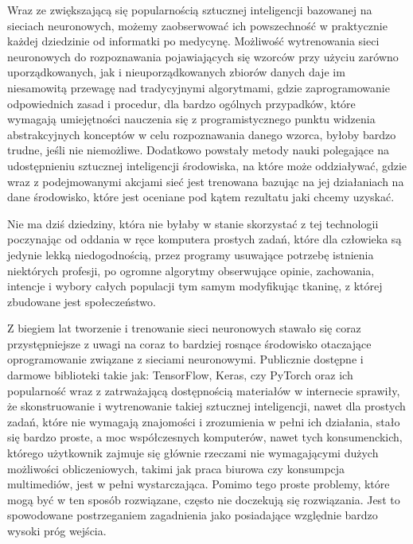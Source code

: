 Wraz ze zwiększającą się popularnością sztucznej inteligencji bazowanej na sieciach neuronowych, możemy zaobserwować ich powszechność w praktycznie każdej dziedzinie od informatki po medycynę. Możliwość wytrenowania sieci neuronowych do rozpoznawania pojawiających się wzorców przy użyciu zarówno uporządkowanych, jak i nieuporządkowanych zbiorów danych daje im niesamowitą przewagę nad tradycyjnymi algorytmami, gdzie zaprogramowanie odpowiednich zasad i procedur, dla bardzo ogólnych przypadków, które wymagają umiejętności nauczenia się z programistycznego punktu widzenia abstrakcyjnych konceptów w celu rozpoznawania danego wzorca, byłoby bardzo trudne, jeśli nie niemożliwe. Dodatkowo powstały metody nauki polegające na udostępnieniu  sztucznej inteligencji środowiska, na które może oddziaływać, gdzie wraz z podejmowanymi akcjami sieć jest trenowana bazując na jej działaniach na dane środowisko, które jest oceniane pod kątem rezultatu jaki chcemy uzyskać.

Nie ma dziś dziedziny, która nie byłaby w stanie skorzystać z tej technologii poczynając od oddania w ręce komputera prostych zadań, które dla człowieka są jedynie lekką niedogodnością, przez programy usuwające potrzebę istnienia niektórych profesji, po ogromne algorytmy obserwujące opinie, zachowania, intencje i wybory całych populacji tym samym modyfikując tkaninę, z której zbudowane jest społeczeństwo.


Z biegiem lat tworzenie i trenowanie sieci neuronowych stawało się coraz przystępniejsze z uwagi na coraz to bardziej rosnące środowisko otaczające oprogramowanie związane z sieciami neuronowymi. Publicznie dostępne i darmowe biblioteki takie jak: TensorFlow, Keras, czy PyTorch oraz ich popularność wraz z zatrważającą dostępnością materiałów w internecie sprawiły, że skonstruowanie i wytrenowanie takiej sztucznej inteligencji, nawet dla prostych zadań, które nie wymagają znajomości i zrozumienia w pełni ich działania, stało się bardzo proste, a moc współczesnych komputerów, nawet tych konsumenckich, którego użytkownik zajmuje się głównie rzeczami nie wymagającymi dużych możliwości obliczeniowych, takimi jak praca biurowa czy konsumpcja multimediów, jest w pełni wystarczająca. Pomimo tego proste problemy, które mogą być w ten sposób rozwiązane, często nie doczekują się rozwiązania. Jest to spowodowane postrzeganiem zagadnienia jako posiadające względnie bardzo wysoki próg wejścia.

